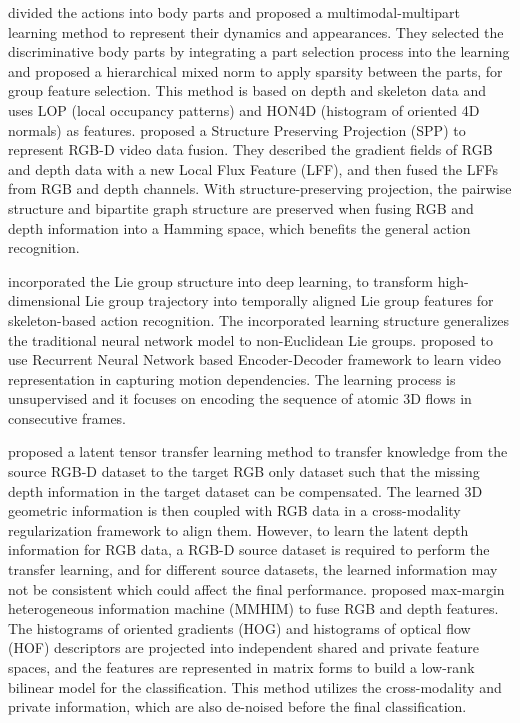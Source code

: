 \documentclass[twocolumn]{svjour3}          \smartqed  \usepackage{graphicx}
\begin{document}
\citet{shahroudy2016multimodal} divided the actions into body parts and proposed a multimodal-multipart learning method to represent their dynamics and appearances. They selected the discriminative body parts by integrating a part selection process into the learning and proposed a hierarchical mixed norm to apply sparsity between the parts, for group feature selection. This method is based on depth and skeleton data and uses LOP (local occupancy patterns) and HON4D (histogram of oriented 4D normals) as features. \citet{yu2016structure} proposed a Structure Preserving Projection (SPP) to represent RGB-D video data fusion. They described the gradient fields of RGB and depth data with a new Local Flux Feature (LFF), and then fused the LFFs from RGB and depth channels. With structure-preserving projection, the pairwise structure and bipartite graph structure are preserved when fusing RGB and depth information into a Hamming space, which benefits the general action recognition. 

\citet{huang2016deep} incorporated the Lie group structure into deep learning, to transform  high-dimensional Lie group trajectory into temporally aligned Lie group features for skeleton-based action recognition. The incorporated learning structure generalizes the traditional neural network model to non-Euclidean Lie groups. \citet{luo2017unsupervised} proposed to use Recurrent Neural Network based Encoder-Decoder framework to learn video representation in capturing motion dependencies. The learning process is unsupervised and it focuses on encoding the sequence of atomic 3D flows in consecutive frames.

\citet{jia2014latent} proposed a latent tensor transfer learning method to transfer knowledge from the source RGB-D dataset to the target RGB only dataset such that the missing depth information in the target dataset can be compensated. The learned 3D geometric information is then coupled with RGB data in a cross-modality regularization framework to align them. However, to learn the latent depth information for RGB data, a RGB-D source dataset is required to perform the transfer learning, and for different source datasets, the learned information may not be consistent which could affect the final performance. \citet{kong2017max} proposed max-margin heterogeneous information machine (MMHIM) to fuse RGB and depth features. The histograms of oriented gradients (HOG) and histograms of optical flow (HOF) descriptors are projected into independent shared and private feature spaces, and the features are represented in matrix forms to build a low-rank bilinear model for the classification. This method utilizes the cross-modality and private information, which are also de-noised before the final classification.
\end{document}
